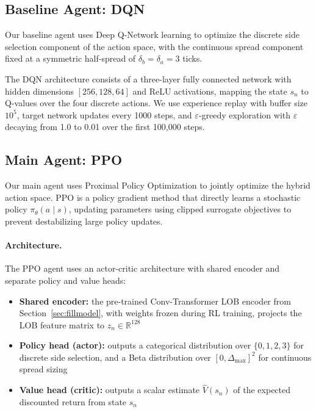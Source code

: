 \documentclass[12pt]{article}
\begin{document}
\subsection{Baseline Agent: DQN}

Our baseline agent uses Deep Q-Network learning \citep{mnih2015} to optimize the discrete side selection component of the action space, with the continuous spread component fixed at a symmetric half-spread of $\delta_b = \delta_a = 3$ ticks.

The DQN architecture consists of a three-layer fully connected network with hidden dimensions $[256, 128, 64]$ and ReLU activations, mapping the state $s_n$ to Q-values over the four discrete actions. We use experience replay with buffer size $10^5$, target network updates every 1000 steps, and $\varepsilon$-greedy exploration with $\varepsilon$ decaying from 1.0 to 0.01 over the first 100,000 steps.

\subsection{Main Agent: PPO}

Our main agent uses Proximal Policy Optimization \citep{schulman2017} to jointly optimize the hybrid action space. PPO is a policy gradient method that directly learns a stochastic policy $\pi_\theta(a \mid s)$, updating parameters using clipped surrogate objectives to prevent destabilizing large policy updates.

\paragraph{Architecture.} The PPO agent uses an actor-critic architecture with shared encoder and separate policy and value heads:
\begin{itemize}[leftmargin=2em]
  \item \textbf{Shared encoder:} the pre-trained Conv-Transformer LOB encoder from Section~\ref{sec:fillmodel}, with weights frozen during RL training, projects the LOB feature matrix to $z_n \in \mathbb{R}^{128}$
  \item \textbf{Policy head (actor):} outputs a categorical distribution over $\{0, 1, 2, 3\}$ for discrete side selection, and a Beta distribution over $[0, \Delta_{\max}]^2$ for continuous spread sizing
  \item \textbf{Value head (critic):} outputs a scalar estimate $\hat{V}(s_n)$ of the expected discounted return from state $s_n$
\end{itemize}
\end{document}
